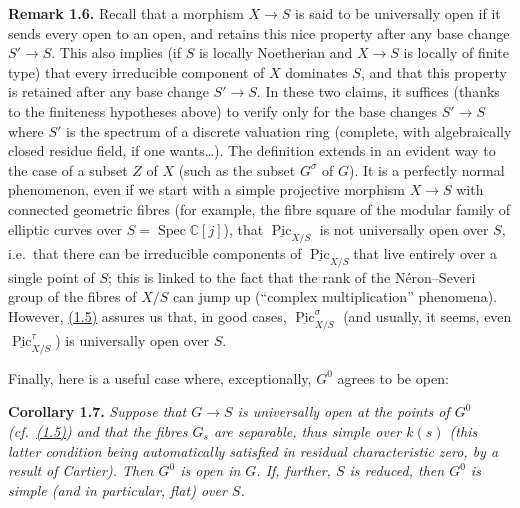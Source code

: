 \documentclass{article}
\newenvironment{itenv}[1]
  {\phantomsection\par\smallskip\noindent\textbf{#1.}\itshape}
  {\par\smallskip}
\newenvironment{rmenv}[1]
  {\phantomsection\par\smallskip\noindent\textbf{#1.}\rmfamily}
  {\par\smallskip}
\newcommand{\oldpage}[1]{\marginpar{\footnotesize$\Big\vert$ \textit{p.~#1}}}
\theoremstyle{definition}
\theoremstyle{definition}
\theoremstyle{definition}
\theoremstyle{definition}
\theoremstyle{remark}
\begin{document}
\leavevmode{}%
\begin{rmenv}{Remark 1.6}
Recall that a morphism \(X\to S\) is said to be universally open if it sends every open to an open, and retains this nice property after any base change \(S'\to S\).
This also implies (if \(S\) is locally Noetherian and \(X\to S\) is locally of finite type) that every irreducible component of \(X\) dominates \(S\), and that this property is retained after any base change \(S'\to S\).
In these two claims, it suffices (thanks to the finiteness hypotheses above) to verify only for the base changes \(S'\to S\) where \(S'\) is the spectrum of a discrete valuation ring (complete, with algebraically closed residue field, if one wants\ldots).
The definition extends in an evident way to the case of a subset \(Z\) of \(X\) (such as the subset \(G^\sigma\) of \(G\)).
It is a perfectly normal phenomenon, even if we start with a simple projective morphism \(X\to S\) with connected geometric fibres (for example, the fibre square of the modular family of elliptic curves over \(S=\operatorname{Spec}\mathbb{C}[j]\)), that \(\underline{\operatorname{Pic}}_{X/S}\) is not universally open over \(S\), i.e.~that there can be irreducible components of \(\underline{\operatorname{Pic}}_{X/S}\)that live entirely over a single point of \(S\);
this is linked to the fact that the rank of the Néron--Severi group of the fibres of \(X/S\) can jump up (``complex multiplication'' phenomena).
However, \protect\hyperlink{fga-3-vi-corollary-1.5}{(1.5)} assures us that, in good cases, \(\underline{\operatorname{Pic}}_{X/S}^\sigma\) (and usually, it seems, even \(\underline{\operatorname{Pic}}_{X/S}^\tau\)) is universally open over \(S\).

\end{rmenv}

\oldpage{236-09}Finally, here is a useful case where, exceptionally, \(G^0\) agrees to be open:

\leavevmode{}%
\begin{itenv}{Corollary 1.7}
Suppose that \(G\to S\) is universally open at the points of \(G^0\) (cf.~\protect\hyperlink{fga-3-vi-corollary-1.5}{(1.5)}) and that the fibres \(G_s\) are separable, thus simple over \(k(s)\) (this latter condition being automatically satisfied in residual characteristic zero, by a result of Cartier).
Then \(G^0\) is open in \(G\).
If, further, \(S\) is reduced, then \(G^0\) is simple (and in particular, flat) over \(S\).

\end{itenv}
\end{document}
